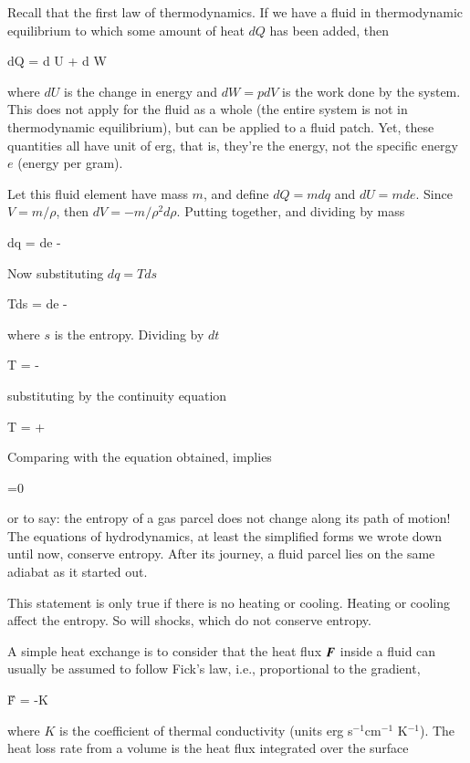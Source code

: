 Recall that the first law of thermodynamics. If we have a fluid in thermodynamic
equilibrium to which some amount of heat $dQ$ has been added, then

\beq
dQ = d U + d W
\label{eq:first-law-thermo}
\eeq

\noindent where $dU$ is the change in energy and $dW=p dV$ is the work done
by the system. This does not apply for the fluid as a whole (the
entire system is not in thermodynamic equilibrium), but can be applied
to a fluid patch. Yet, these quantities all have unit of erg, that is, they're the
energy, not the specific energy $e$ (energy per gram). 

Let this fluid element have mass $ m$, and define $dQ =  m
dq$ and $dU = m de$. Since $V = m / \rho$, then
$dV=-m/\rho^2 d\rho$. Putting together, and dividing by mass 

\beq
dq = de -  \rho
\label{eq:first-law-thermo}
\eeq

\noindent Now substituting $dq=Tds$ 

\beq
Tds  = de -  \rho 
\eeq

\noindent where $s$ is the entropy. Dividing by $dt$

\beq
T  =  -  
\eeq

\noindent substituting by the continuity equation 

\beq
T  =  +  
\eeq

\noindent Comparing with the equation obtained, implies 

\beq
{}=0
\eeq

\noindent or to say: the entropy of a gas parcel does not change along
its path of motion! The equations of hydrodynamics, at least the
simplified forms we wrote down until now, conserve entropy.
After its journey, a fluid parcel lies on the same adiabat as it started out.

This statement is only true if there is no heating or cooling. Heating or cooling
affect the entropy. So will shocks, which do not conserve entropy.

A simple heat exchange is to consider that the heat flux ${\boldsymbol{F}}$ inside a
fluid can usually be assumed to follow Fick's law, i.e., proportional
to the gradient, 

\beq
\v{F} = -K
\eeq

\noindent where $K$ is the coefficient of thermal conductivity (units erg s$^{-1}$cm$^{-1}$ K$^{-1}$). The heat loss
rate from a volume is the heat flux integrated over the surface

